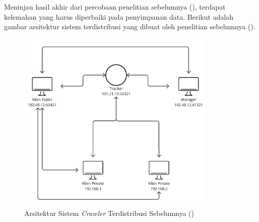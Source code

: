 Meninjau hasil akhir dari percobaan penelitian sebelumnya (\cite{ridho2024}),  terdapat kelemahan 
yang harus diperbaiki pada penyimpanan data. Berikut adalah gambar arsitektur sistem 
terdistribusi yang dibuat oleh penelitian sebelumnya (\cite{ridho2024}).

\begin{figure}[H]
  \centering{}
	\includegraphics[width=0.85\textwidth]{gambar/bab1/arsitektur_baru}
  \caption{Arsitektur Sistem \emph{Crawler} Terdistribusi Sebelumnya (\cite{ridho2024})} 
\end{figure}

